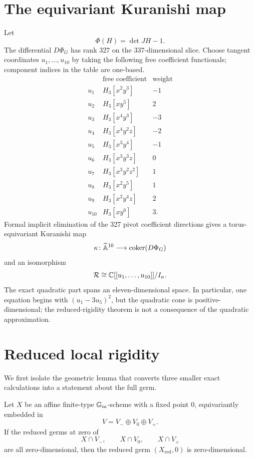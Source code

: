 \documentclass[11pt,reqno]{amsart}
\begin{document}
\section{The equivariant Kuranishi map}
\label{sec:kuranishi}

Let
\[
\Phi(H)=\det JH-1.
\]
The differential \(D\Phi_G\) has rank \(327\) on the 337-dimensional slice.
Choose tangent coordinates \(u_1,\ldots,u_{10}\) by taking the following free
coefficient functionals; component indices in the table are one-based.
\[
\begin{array}{c|c|r}
&\text{free coefficient}&\text{weight}\\ \hline
u_1&H_3[x^2y^3]&-1\\
u_2&H_3[xy^5]&2\\
u_3&H_3[x^4y^3]&-3\\
u_4&H_3[x^4y^2z]&-2\\
u_5&H_3[x^3y^4]&-1\\
u_6&H_3[x^3y^3z]&0\\
u_7&H_3[x^3y^2z^2]&1\\
u_8&H_3[x^2y^5]&1\\
u_9&H_3[x^2y^4z]&2\\
u_{10}&H_3[xy^6]&3.
\end{array}
\]
Formal implicit elimination of the 327 pivot coefficient directions gives a
torus-equivariant Kuranishi map
\[
\kappa\colon\widehat{\mathbb A}^{10}\longrightarrow
\operatorname{coker}(D\Phi_G)
\]
and an isomorphism
\begin{equation}
\label{eq:kuranishi-ring}
\mathcal R\cong
\mathbb C[[u_1,\ldots,u_{10}]]/I_\kappa.
\end{equation}
The exact quadratic part spans an eleven-dimensional space.  In particular,
one equation begins with \((u_1-3u_5)^2\), but the quadratic cone is
positive-dimensional; the reduced-rigidity theorem is not a consequence of
the quadratic approximation.

\section{Reduced local rigidity}
\label{sec:reduced}

We first isolate the geometric lemma that converts three smaller exact
calculations into a statement about the full germ.

\begin{lemma}
\label{lem:nullcone}
Let \(X\) be an affine finite-type \(\mathbb G_{\mathrm m}\)-scheme with a fixed point \(0\),
equivariantly embedded in
\[
V=V_-\oplus V_0\oplus V_+.
\]
If the reduced germs at zero of
\[
X\cap V_-,\qquad X\cap V_0,\qquad X\cap V_+
\]
are all zero-dimensional, then the reduced germ
\((X_{\mathrm{red}},0)\) is zero-dimensional.
\end{lemma}
\end{document}
